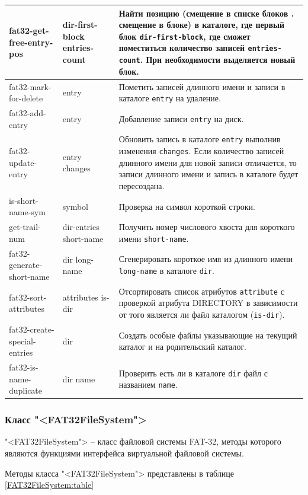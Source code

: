 \begin{xltabular}{\textwidth}{|p{3.5cm}|p{3.5cm}|>{\setlength{\baselineskip}{0.7\baselineskip}}X|}
	fat32-get-free-entry-pos & dir-first-block entries-count & Найти позицию (смещение в списке блоков . смещение в блоке) в каталоге, где первый блок \texttt{dir-first-block}, где сможет поместиться количество записей \texttt{entries-count}. При необходимости выделяется новый блок. \\ \hline
	fat32-mark-for-delete & entry & Пометить записей длинного имени и записи в каталоге \texttt{entry} на удаление. \\ \hline
	fat32-add-entry & entry & Добавление записи \texttt{entry} на диск. \\ \hline
	fat32-update-entry & entry changes & Обновить запись в каталоге \texttt{entry} выполнив изменения \texttt{changes}. Если количество записей длинного имени для новой записи отличается, то записи длинного имени и запись в каталоге будет пересоздана. \\ \hline
	is-short-name-sym & symbol & Проверка на символ короткой строки. \\ \hline
	get-trail-num & dir-entries short-name & Получить номер числового хвоста для короткого имени \texttt{short-name}. \\ \hline
	fat32-generate-short-name & dir long-name & Сгенерировать короткое имя из длинного имени \texttt{long-name} в каталоге \texttt{dir}. \\ \hline
	fat32-sort-attributes & attributes is-dir & Отсортировать список атрибутов \texttt{attribute} с проверкой атрибута DIRECTORY в зависимости от того является ли файл каталогом (\texttt{is-dir}). \\ \hline
	fat32-create-special-entries & dir & Создать особые файлы указывающие на текущий каталог и на родительский каталог. \\ \hline
	fat32-is-name-duplicate & dir name & Проверить есть ли в каталоге \texttt{dir} файл с названием \texttt{name}.
\end{xltabular}
\renewcommand{\arraystretch}{1.0} %

\subsubsection{Класс "<FAT32FileSystem">}

"<FAT32FileSystem"> -- класс файловой системы FAT-32, методы которого являются функциями интерфейса виртуальной файловой системы.

Методы класса "<FAT32FileSystem"> представлены в таблице \ref{FAT32FileSystem:table}


